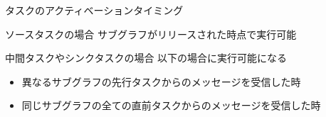 

\begin{frame}{タスクのアクティベーションタイミング}
    \begin{block}{ソースタスクの場合}
        サブグラフがリリースされた時点で実行可能
    \end{block}
    \begin{block}{中間タスクやシンクタスクの場合}
        以下の場合に実行可能になる
        \setlength{\linewidth}{0.98\columnwidth}
        \begin{itemize}
            \item 異なるサブグラフの先行タスクからのメッセージを受信した時
            \item 同じサブグラフの全ての直前タスクからのメッセージを受信した時
        \end{itemize}
    \end{block}
\end{frame}


